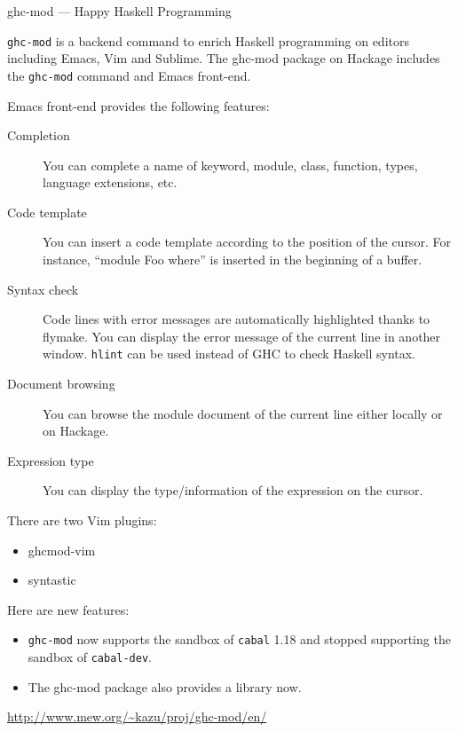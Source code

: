\begin{hcarentry}[updated]{ghc-mod --- Happy Haskell Programming}
\makeheader

{\tt ghc-mod} is a backend command to enrich Haskell programming on editors including Emacs, Vim and Sublime. The ghc-mod package on Hackage includes the {\tt ghc-mod} command and Emacs front-end. 

Emacs front-end provides the following features:

\begin{description}
\item[Completion] You can complete a name of keyword, module, class, function, types, language extensions, etc.

\item[Code template] You can insert a code template according to the position of the cursor. For instance, ``module Foo where'' is inserted in the beginning of a buffer.

\item[Syntax check] Code lines with error messages are automatically highlighted thanks to flymake. You can display the error message of the current line in another window. {\tt hlint} %
can be used instead of GHC to check Haskell syntax. 

\item[Document browsing] You can browse the module document of the current line either locally or on Hackage.

\item[Expression type] You can display the type/information of the expression on the cursor. 
\end{description}

There are two Vim plugins:

\begin{itemize}
\item ghcmod-vim
\item syntastic
\end{itemize}

Here are new features:

\begin{itemize}
\item {\tt ghc-mod} now supports the sandbox of {\tt cabal} 1.18 and stopped supporting the sandbox of {\tt cabal-dev}.
\item The ghc-mod package also provides a library now.
\end{itemize}

\FurtherReading
  \url{http://www.mew.org/~kazu/proj/ghc-mod/en/}
\end{hcarentry}
